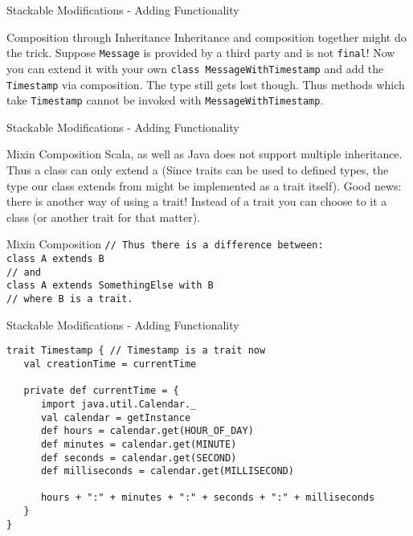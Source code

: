 \begin{frame}[fragile]{Stackable Modifications - Adding Functionality}
\begin{block}{Composition through Inheritance}
Inheritance and composition together might do the trick. Suppose
\lstinline!Message! is provided by a third party and is not \lstinline!final!!
Now you can extend it with your own \lstinline!class MessageWithTimestamp! and
add the \lstinline!Timestamp! via composition. \alert{The type still gets lost
though}. Thus methods which take \lstinline!Timestamp! cannot be invoked with
\lstinline!MessageWithTimestamp!.
\end{block}
\end{frame}

\begin{frame}[fragile]{Stackable Modifications - Adding Functionality}
\begin{block}{Mixin Composition}
Scala, as well as Java \alert{does not support multiple inheritance}. Thus a
class can only extend a  (Since traits can be
used to defined types, the type our class extends from might be implemented as a trait itself).
Good news: there is another way of using a trait! Instead of
 a trait you can choose to  it
 a class (or another trait for that matter).
\end{block}
\pause
\begin{block}{Mixin Composition}
\lstinline!// Thus there is a difference between:!\\
\lstinline!class A extends B!\\
\lstinline!// and!\\
\lstinline!class A extends SomethingElse with B!\\
\lstinline!// where B is a trait.!
\end{block}
\end{frame}

\begin{frame}[fragile]{Stackable Modifications - Adding Functionality}
\begin{lstlisting}
trait Timestamp { // Timestamp is a trait now
   val creationTime = currentTime
   
   private def currentTime = {
      import java.util.Calendar._
      val calendar = getInstance
      def hours = calendar.get(HOUR_OF_DAY)
      def minutes = calendar.get(MINUTE)
      def seconds = calendar.get(SECOND)
      def milliseconds = calendar.get(MILLISECOND)
      
      hours + ":" + minutes + ":" + seconds + ":" + milliseconds
   }
}
\end{lstlisting}
\end{frame}

